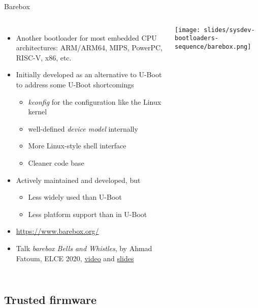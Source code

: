 \begin{frame}{Barebox}
  \begin{columns}[T]
    \begin{itemize}
    \item Another bootloader for most embedded CPU architectures:
      ARM/ARM64, MIPS, PowerPC, RISC-V, x86, etc.
    \item Initially developed as an alternative to U-Boot to address
      some U-Boot shortcomings
      \begin{itemize}
      \item {\em kconfig} for the configuration like the Linux kernel
      \item well-defined {\em device model} internally
      \item More Linux-style shell interface
      \item Cleaner code base
      \end{itemize}
    \item Actively maintained and developed, but
      \begin{itemize}
      \item Less widely used than U-Boot
      \item Less platform support than in U-Boot
      \end{itemize}
    \item \url{https://www.barebox.org/}
    \item Talk {\em barebox Bells and Whistles}, by Ahmad Fatoum, ELCE
      2020, \href{https://youtu.be/Oj7lKbFtyM0}{video} and
      \href{https://elinux.org/images/9/9d/Barebox-bells-n-whistles.pdf}{slides}
    \end{itemize}
    \texttt{[image: slides/sysdev-bootloaders-sequence/barebox.png]}
  \end{columns}
\end{frame}

\subsection{Trusted firmware}

